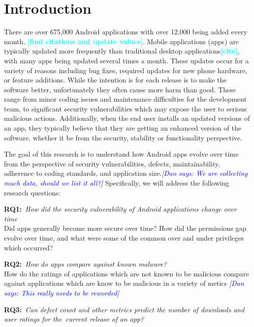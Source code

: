 \documentclass{sig-alternate}
\newcommand{\todo}[1]{\textcolor{cyan}{\textbf{[#1]}}}
\newcommand{\dan}[1]{\textcolor{blue}{{\it [Dan says: #1]}}}
\begin{document}
\terms{}


\section{Introduction}

There are over 675,000 Android applications with over 12,000 being added every month. \todo{find citations and update values}. Mobile applications (apps) are typically updated more frequently than traditional desktop applications\todo{cite}, with many apps being updated several times a month. These updates occur for a variety of reasons including bug fixes, required updates for new phone hardware, or feature additions. While the intention is for each release is to make the software better, unfortunately they often cause more harm than good. These range from minor coding issues and maintenance difficulties for the development team, to significant security vulnerabilities which may expose the user to serious malicious actions. Additionally, when the end user installs an updated versions of an app, they typically believe that they are getting an enhanced version of the software, whether it be from the security, stability or functionality perspective.

The goal of this research is to understand how Android apps evolve over time from the perspective of security vulnerabilities, defects, maintainability, adherence to coding standards, and application size.\dan{We are collecting much data, should we list it all?}  Specifically, we will address the following research questions:

\textbf{RQ1:}~\emph{How did the security vulnerability of Android applications change over time}\\
Did apps generally become more secure over time? How did the permissions gap evolve over time, and what were some of the common over and under privileges which occurred?


\textbf{RQ2:}~\emph{How do apps compare against known malware?}\\
How do the ratings of applications which are not known to be malicious compare against applications which are know to be malicious in a variety of metics \dan{This really needs to be reworded}

\textbf{RQ3:}~\emph{Can defect count and other metrics predict the number of downloads and user ratings for the~\emph{current} release of an app?}\\
\end{document}
